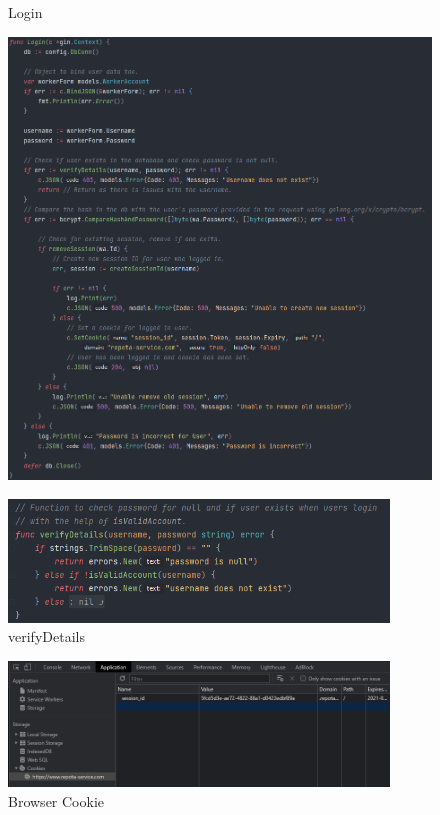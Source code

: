 \begin{figure}[H]
\centering
\begin{minipage}[b]{0.6\linewidth}
    \centering
    \caption{Login}
    \label{image:login}
    \includegraphics[width=1.0\textwidth]{images/horton/account_system/login_func.png}
\end{minipage}
\quad
\begin{minipage}[b]{0.6\linewidth}
    \centering
    \caption{verifyDetails}
    \label{image:verify}
    \includegraphics[width=0.9\textwidth]{images/horton/account_system/verifyDetails.png}
\end{minipage}
\end{figure}
 
\begin{figure}[H]
    \centering
    \caption{Browser Cookie}
    \label{image:cookie}
    \includegraphics[width=0.9\textwidth]{images/horton/account_system/cookie.png}
\end{figure}

